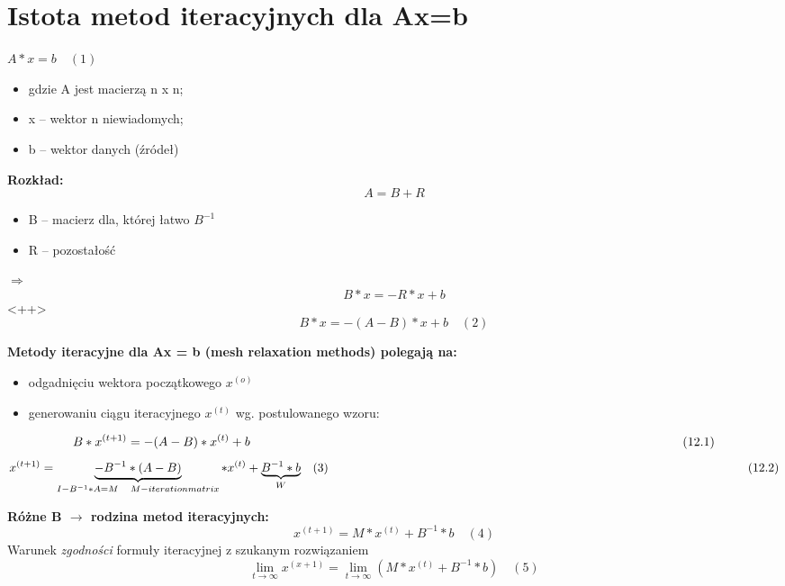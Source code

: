 \section{Istota metod iteracyjnych dla Ax=b}

\begin{frame}{}
    \begin{center}
      $A*x=b\quad(1)$
    \end{center}
    \begin{itemize}
      \item gdzie A jest macierzą n x n;
      \item x -- wektor n niewiadomych;
      \item b -- wektor danych (źródeł)
    \end{itemize}
\end{frame}

\begin{frame}
  \begin{block}{\textbf{Rozkład:}}
      $$A=B+R$$
    \begin{itemize}
      \item B -- macierz dla, której łatwo $B^{-1}$
      \item R -- pozostałość
    \end{itemize}
    $\Rightarrow$
    $$B*x=-R*x+b$$<++>
  $$\boxed{B*x=-(A-B)*x+b}\quad(2)$$
  \end{block}
\end{frame}

\begin{frame}{}
    \textbf{Metody iteracyjne dla Ax = b (mesh relaxation methods) polegają na:}
    \begin{itemize}
      \item odgadnięciu wektora początkowego $x^{(o)}$
      \item generowaniu ciągu iteracyjnego $x^{(t)}$ wg. postulowanego wzoru:
    \end{itemize}
    $$B*x^{(t+1)}=-(A-B)*x^{(t)}+b \hskip \textwidth minus \textwidth (12.1)$$
    $$x^{(t+1)}=\underbrace{-B^{-1}*(A-B)}_{I-B^{-1}*A=M \quad M - iteration matrix} *x^{(t)}+\underbrace{B^{-1}*b}_{W}\quad(3) \hskip \textwidth minus \textwidth (12.2)$$
\end{frame}

\begin{frame}{}
    \textbf{Różne B $\rightarrow$ rodzina metod iteracyjnych:}
    $$\boxed{x^{(t+1)}=M*x^{(t)}+B^{-1}*b}\quad(4)$$
    Warunek \emph{zgodności} formuły iteracyjnej z szukanym rozwiązaniem
    $$\lim_{t\to\infty} x^{(x+1)}= \lim_{t\to\infty}  (M*x^{(t)}+B^{-1}*b) \quad (5)$$
\end{frame}

